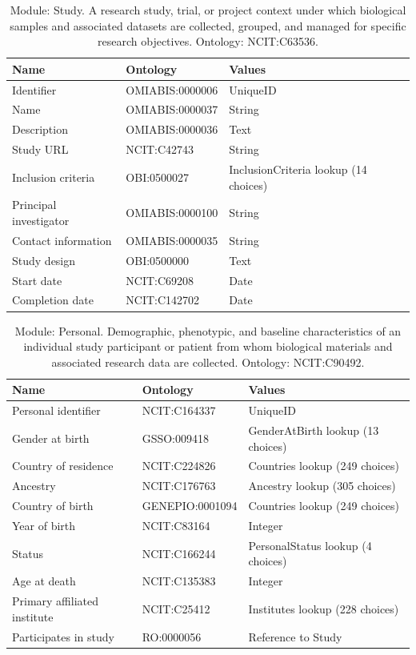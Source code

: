 \documentclass{article}
\begin{document}
\begin{table}[htb]
\begin{tabular}{lll}
Name & Ontology & Values \\
\hline
Identifier & OMIABIS:0000006 & UniqueID \\
Name & OMIABIS:0000037 & String \\
Description & OMIABIS:0000036 & Text \\
Study URL & NCIT:C42743 & String \\
Inclusion criteria & OBI:0500027 & InclusionCriteria lookup (14 choices) \\
Principal investigator & OMIABIS:0000100 & String \\
Contact information & OMIABIS:0000035 & String \\
Study design & OBI:0500000 & Text \\
Start date & NCIT:C69208 & Date \\
Completion date & NCIT:C142702 & Date \\
\hline
\end{tabular}
\caption[Module: Study]{\label{table:table2} Module: Study. A research study, trial, or project context under which biological samples and associated datasets are collected, grouped, and managed for specific research objectives. Ontology: NCIT:C63536. }
\end{table}

\begin{table}[htb]
\begin{tabular}{lll}
Name & Ontology & Values \\
\hline
Personal identifier & NCIT:C164337 & UniqueID \\
Gender at birth & GSSO:009418 & GenderAtBirth lookup (13 choices) \\
Country of residence & NCIT:C224826 & Countries lookup (249 choices) \\
Ancestry & NCIT:C176763 & Ancestry lookup (305 choices) \\
Country of birth & GENEPIO:0001094 & Countries lookup (249 choices) \\
Year of birth & NCIT:C83164 & Integer \\
Status & NCIT:C166244 & PersonalStatus lookup (4 choices) \\
Age at death & NCIT:C135383 & Integer \\
Primary affiliated institute & NCIT:C25412 & Institutes lookup (228 choices) \\
Participates in study & RO:0000056 & Reference to Study \\
\hline
\end{tabular}
\caption[Module: Personal]{\label{table:table3} Module: Personal. Demographic, phenotypic, and baseline characteristics of an individual study participant or patient from whom biological materials and associated research data are collected. Ontology: NCIT:C90492. }
\end{table}
\end{document}
